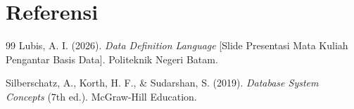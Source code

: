 \documentclass[11pt,a4paper]{article}
\begin{document}
\newpage
\section*{Referensi}

\begin{thebibliography}{99}
	Lubis, A. I. (2026). \textit{Data Definition Language} [Slide Presentasi Mata Kuliah Pengantar Basis Data]. Politeknik Negeri Batam.

	Silberschatz, A., Korth, H. F., \& Sudarshan, S. (2019). \textit{Database System Concepts} (7th ed.). McGraw-Hill Education.
\end{thebibliography}
\end{document}
